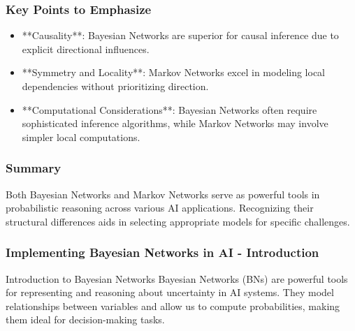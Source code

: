 \documentclass[aspectratio=169]{beamer}
\begin{document}
\begin{frame}[fragile]
    \frametitle{Key Points to Emphasize}
    \begin{itemize}
        \item **Causality**: Bayesian Networks are superior for causal inference due to explicit directional influences.
        \item **Symmetry and Locality**: Markov Networks excel in modeling local dependencies without prioritizing direction.
        \item **Computational Considerations**: Bayesian Networks often require sophisticated inference algorithms, while Markov Networks may involve simpler local computations.
    \end{itemize}
\end{frame}

\begin{frame}[fragile]
    \frametitle{Summary}
    Both Bayesian Networks and Markov Networks serve as powerful tools in probabilistic reasoning across various AI applications. Recognizing their structural differences aids in selecting appropriate models for specific challenges.
\end{frame}

\begin{frame}[fragile]
    \frametitle{Implementing Bayesian Networks in AI - Introduction}
    \begin{block}{Introduction to Bayesian Networks}
        Bayesian Networks (BNs) are powerful tools for representing and reasoning about uncertainty in AI systems. They model relationships between variables and allow us to compute probabilities, making them ideal for decision-making tasks.
    \end{block}
\end{frame}
\end{document}
